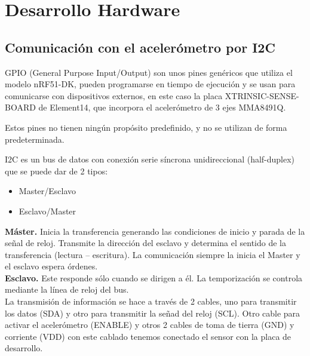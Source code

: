 \cleardoublepage

\chapter{Desarrollo Hardware}
\label{makereference5}

\section{Comunicación con el acelerómetro por I2C}
\label{makereference5.1}

GPIO (General Purpose Input/Output) son unos pines genéricos que utiliza el modelo nRF51-DK, pueden programarse en tiempo de ejecución y se usan para comunicarse con dispositivos externos, en este caso la placa  XTRINSIC-SENSE-BOARD de Element14, que incorpora el acelerómetro de 3 ejes MMA8491Q.

Estos pines no tienen ningún propósito predefinido, y no se utilizan de forma predeterminada.

I2C es un bus de datos con conexión serie síncrona unidireccional (half-duplex) que se puede dar de 2 tipos:
\begin{itemize}
	\item Master/Esclavo
	\item Esclavo/Master
\end{itemize}

\textbf{Máster.} Inicia la transferencia generando las condiciones de inicio y parada de la señal de reloj. Transmite la dirección del esclavo y determina el sentido de la transferencia (lectura –
escritura). La comunicación siempre la inicia el Master y el esclavo espera órdenes.\\

\textbf{Esclavo.} Este responde sólo cuando se dirigen a él. La temporización se controla mediante la línea de reloj del bus.\\

La transmisión de información se hace a través de 2 cables, uno para transmitir los datos (SDA) y otro para transmitir la señad del reloj (SCL). Otro cable para activar el acelerómetro (ENABLE) y otros 2 cables de toma de tierra (GND) y corriente (VDD) con este cablado tenemos conectado el sensor con la placa de desarrollo.

